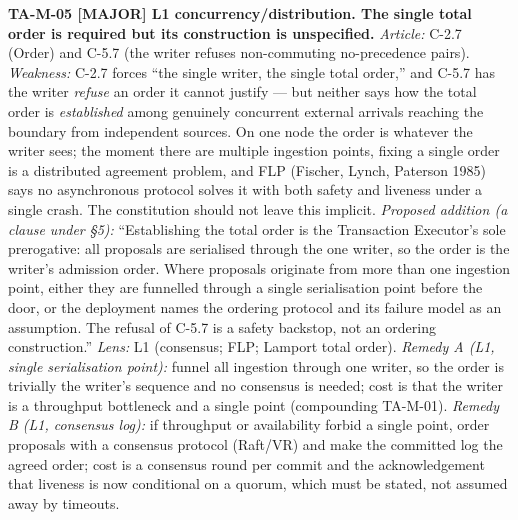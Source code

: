 \documentclass[11pt,a4paper]{article}
\newcommand{\sev}[1]{\textbf{[#1]}}
\newcommand{\lens}[1]{\textnormal{#1}}
\newcommand{\finding}[1]{\medskip\noindent\textbf{#1}}
\begin{document}
\finding{TA-M-05 \sev{MAJOR} \lens{L1 concurrency/distribution}. The single total order is
required but its construction is unspecified.}
\emph{Article:} C-2.7 (Order) and C-5.7 (the writer refuses non-commuting no-precedence pairs).
\emph{Weakness:} C-2.7 forces ``the single writer, the single total order,'' and C-5.7 has the
writer \emph{refuse} an order it cannot justify --- but neither says how the total order is
\emph{established} among genuinely concurrent external arrivals reaching the boundary from
independent sources. On one node the order is whatever the writer sees; the moment there are
multiple ingestion points, fixing a single order is a distributed agreement problem, and FLP
(Fischer, Lynch, Paterson 1985) says no asynchronous protocol solves it with both safety and
liveness under a single crash. The constitution should not leave this implicit. \emph{Proposed
addition (a clause under §5):} ``Establishing the total order is the Transaction Executor's sole
prerogative: all proposals are serialised through the one writer, so the order is the writer's
admission order. Where proposals originate from more than one ingestion point, either they are
funnelled through a single serialisation point before the door, or the deployment names the
ordering protocol and its failure model as an assumption. The refusal of C-5.7 is a safety
backstop, not an ordering construction.'' \emph{Lens:} L1 (consensus; FLP; Lamport total order).
\emph{Remedy A (L1, single serialisation point):} funnel all ingestion through one writer, so
the order is trivially the writer's sequence and no consensus is needed; cost is that the writer
is a throughput bottleneck and a single point (compounding TA-M-01). \emph{Remedy B (L1,
consensus log):} if throughput or availability forbid a single point, order proposals with a
consensus protocol (Raft/VR) and make the committed log the agreed order; cost is a consensus
round per commit and the acknowledgement that liveness is now conditional on a quorum, which
must be stated, not assumed away by timeouts.
\end{document}
